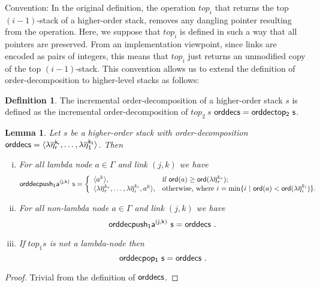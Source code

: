 \documentclass{article}
\newtheorem{lemma}{Lemma}[section]
\theoremstyle{remark}
\theoremstyle{definition}
\newtheorem{definition}{Definition}[section]
\newcommand\orddec{\sf orddec}
\begin{document}


Convention: In the original definition, the operation $top_i$ that returns the top $(i-1)$-stack of a higher-order stack, removes any dangling pointer resulting from the operation. Here, we suppose that $top_i$ is defined in such a way that all pointers are preserved. From an implementation viewpoint, since links are encoded as pairs of integers, this means that $top_i$ just returns an unmodified copy of the top $(i-1)$-stack. This convention allows us to
extend the definition of order-decomposition to higher-level stacks as follows:
\begin{definition}
The incremental order-decomposition
of a higher-order stack $s$ is defined as the incremental
order-decomposition of $top_2~s$ \ie $\orddec{s} = \orddec{top_2~s}$.
\end{definition}


\begin{lemma}
\label{lem:push1pop1_orderdecompo} Let $s$ be a higher-order stack
with order-decomposition $\orddec{s} = \langle \lambda
\overline{\eta}_r^{k_r}, \ldots, \lambda \overline{\eta}_1^{k_1}
\rangle$. Then
\begin{enumerate}[i.]
\item For all lambda node $a \in \Gamma$ and link $(j,k)$ we have
 $$ \orddec{push_1 a^{(j,k)}~s} = \left\{
                                       \begin{array}{ll}
                                        \langle a^k \rangle, &  \hbox{if $\ord{a} \geq \ord{\lambda \overline{\eta}_r^{k_r}}$}; \\
                                         \langle \lambda \overline{\eta}_r^{k_r}, \ldots, \lambda
\overline{\eta}_i^{k_i}, a^k \rangle, & \hbox{otherwise, where $i = \min \{ i \ | \ \ord{a} <
\ord{\lambda \overline{\eta}_i^{k_i}} \}$.}
                                       \end{array}
                                     \right.$$

\item For all non-lambda node $a \in \Gamma$ and link $(j,k)$ we have
$$ \orddec{push_1 a^{(j,k)}~s} = \orddec{s} \ .$$

\item If $top_1 s$ is not a lambda-node then
$$ \orddec{pop_1~s} = \orddec{s} \ .$$
\end{enumerate}
\end{lemma}
\begin{proof}
  Trivial from the definition of  $\orddec{s}$.
\end{proof}
\end{document}
